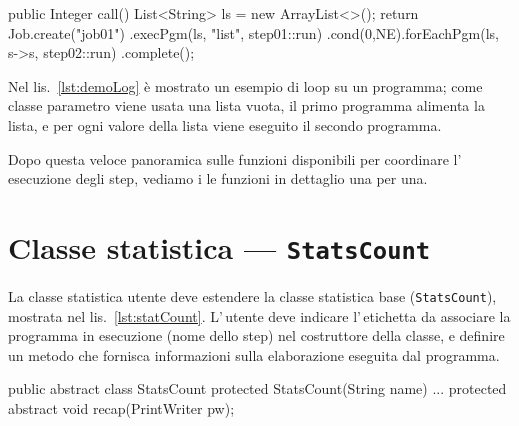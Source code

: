 \begin{elisting}[!htb]
\begin{javacode}
public Integer call() {
    List<String> ls = new ArrayList<>();
    return Job.create("job01")
        .execPgm(ls, "list", step01::run)
        .cond(0,NE).forEachPgm(ls, s->s, step02::run)
        .complete();
}
\end{javacode}
\caption{Esempio uso di loop di un programma}
\label{lst:demoLoop}
\end{elisting}
Nel lis.~\ref{lst:demoLog} è mostrato un esempio di loop su un programma; come
classe parametro viene usata una lista vuota, il primo programma alimenta la
lista, e per ogni valore della lista viene eseguito il secondo programma.

Dopo questa veloce panoramica sulle funzioni disponibili per coordinare
l'\,esecuzione degli step, vediamo i le funzioni in dettaglio una per una.


\section{Classe statistica --- \texttt{StatsCount}}\label{sec:statCount}
La classe statistica utente deve estendere la classe statistica base
(\texttt{StatsCount}), mostrata nel lis.~\ref{lst:statCount}.
L'\,utente deve indicare l'\,etichetta da associare la programma in esecuzione
(nome dello step) nel costruttore della classe, e definire un metodo che
fornisca informazioni sulla elaborazione eseguita dal programma.

\begin{elisting}[!htb]
\begin{javacode}
public abstract class StatsCount {
    protected StatsCount(String name) { ... }
    protected abstract void recap(PrintWriter pw);
}
\end{javacode}
\caption{Costruttore e metodo astratto della classe statistica}
\label{lst:statCount}
\end{elisting}


